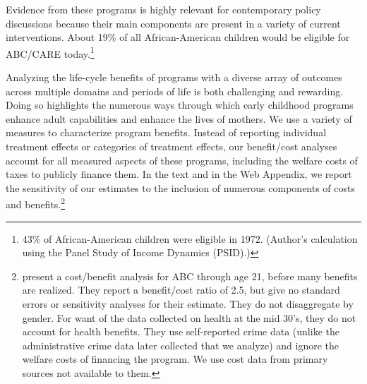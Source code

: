 Evidence from these programs is highly relevant for contemporary policy discussions because their main components are present in a variety of current interventions. About 19\% of all African-American children would be eligible for ABC/CARE today.\footnote{43\% of African-American children were eligible in 1972. (Author's calculation using the Panel Study of Income Dynamics (PSID).)}

Analyzing the life-cycle benefits of programs with a diverse array of outcomes across multiple domains and periods of life is both challenging and rewarding. Doing so highlights the numerous ways through which early childhood programs enhance adult capabilities and enhance the lives of mothers. We use a variety of measures to characterize program benefits. Instead of reporting individual treatment effects or categories of treatment effects, our benefit/cost analyses account for all measured aspects of these programs, including the welfare costs of taxes to publicly finance them. In the text and in the Web Appendix, we report the sensitivity of our estimates to the inclusion of numerous components of costs and benefits.\footnote{\cite{Barnett_Masse_2002_benefitcost,Barnett_Masse_2007_EER} present a cost/benefit analysis for ABC through age 21, before many benefits are realized. They report a benefit/cost ratio of 2.5, but give no standard errors or sensitivity analyses for their estimate. They do not disaggregate by gender. For want of the data collected on health at the mid 30's, they do not account for health benefits. They use self-reported crime data (unlike the administrative crime data later collected that we analyze) and ignore the welfare costs of financing the program. We use cost data from primary sources not available to them.}

